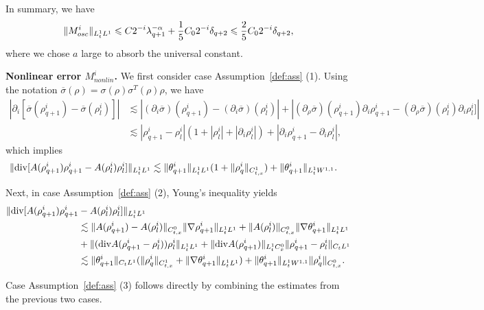 \documentclass[UTF-8,reqno]{amsart}
\numberwithin{equation}{section}
\theoremstyle{definition}
\def\leq{\leqslant}
\def\div{\mathord{{\rm div}}}
\def\leq{\leqslant}
\def\div{\mathord{{\rm div}}}
\begin{document}
In summary, we have
\begin{align}
    \|M^{i}_{osc}\|_{L^1_tL^1} \leq C2^{-i} \lambda_{q+1}^{-\alpha}+ \frac15C_02^{-i}\delta_{q+2}\leq \frac{2}{5}C_02^{-i}\delta_{q+2},\notag
\end{align}
where we chose $a$ large to absorb the universal constant.

\textbf{Nonlinear error $M_{nonlin}^i$.} 
     We first consider case Assumption~\ref{def:ass} \textnormal{(1)}. Using the notation $\overline\sigma(\rho)=\sigma(\rho)\sigma^T(\rho)\rho$, we have 
     \begin{align*}
       |\partial_i[ \overline \sigma(\rho_{q+1}^i)  -   \overline \sigma( \rho_l^i)   ]|&\lesssim  |(\partial_i \overline \sigma)(\rho_{q+1}^i)  -   (\partial_i \overline \sigma)(\rho_{l}^i)   |+|(\partial_\rho \overline \sigma)(\rho_{q+1}^i)\partial_i\rho_{q+1}^i  - (  \partial_\rho\overline \sigma)(\rho_{l}^i)\partial_i\rho_{l}^i  ]|\\
       &\lesssim   |\rho_{q+1}^i- \rho_l^i|(1+| \rho_{l}^i|+|\partial_i\rho_{l}^i|)+|\partial_i\rho_{q+1}^i-\partial_i \rho_l^i| ,
     \end{align*}
     which implies    \begin{align*}
        \|\div[A(\rho_{q+1}^i)\rho_{q+1}^i-A({\rho_l^i}){\rho_l^i}]\|_{L_t^1L^1}&\lesssim\| \theta_{q+1}^i \|_{L^1_tL^1}(1+\|\rho_q^i\|_{C_{t,x}^1})+ \|\theta_{q+1}^i\|_{L^1_tW^{1,1}}.
    \end{align*}
     
Next, in case Assumption~\ref{def:ass} \textnormal{(2)}, Young’s inequality yields
\begin{align*}
      \|\div[A(\rho_{q+1}^i)\rho_{q+1}^i&-A({\rho_l^i}){\rho_l^i}]\|_{L_t^1L^1}\\
      &\lesssim \|A(\rho_{q+1}^i)-A(\rho_l^i)\|_{C_{t,x}^0}\|\nabla\rho_{q+1}^i\|_{L^1_tL^1}+\| A(\rho_l^i)\|_{C_{t,x}^0}\|\nabla\theta_{q+1}^i\|_{L^1_tL^1}\\
     &+\|(\div A(\rho_{q+1}^i - \rho_l^i))\rho_{l}^i\|_{L^1_tL^1} +\|\div A( \rho_{q+1}^i)\|_{L_{t}^1C_{x}^0}\|\rho_{q+1}^i-\rho_l^i\|_{C_tL^1}\\
     &\lesssim \| \theta_{q+1}^i \|_{C_tL^1}(\|\rho_{q}^i\|_{C_{t,x}^1}+\|\nabla\theta_{q+1}^i\|_{L^1_tL^1})+ \|\theta_{q+1}^i \|_{L^1_tW^{1,1}}\|\rho_{q}^i\|_{C_{t,x}^0}.
\end{align*}

Case Assumption~\ref{def:ass} \textnormal{(3)} follows directly by combining the estimates from the previous two cases.
\end{document}
